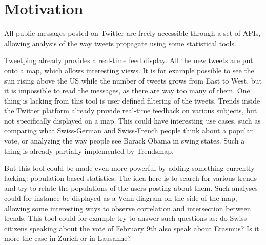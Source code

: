 \section{Motivation}
All public messages posted on Twitter are freely accessible through a set of APIs, allowing analysis of the way tweets propagate using some statistical tools.

\href{http://www.tweetping.net}{Tweetping} already provides a real-time feed display. All the new tweets are put onto a map, which allows interesting views. It is for example possible to see the sun rising above the US while the number of tweets grows from East to West, but it is impossible to read the messages, as there are way too many of them. One thing is lacking from this tool is user defined filtering of the tweets. Trends inside the Twitter platform already provide real-time feedback on various subjects, but not specifically displayed on a map. This could have interesting use cases, such as comparing what Swiss-German and Swiss-French people think about a popular vote, or analyzing the way people see Barack Obama in swing states. Such a thing is already partially implemented by Trendsmap.

But this tool could be made even more powerful by adding something currently lacking: population-based statistics. The idea here is to search for various trends and try to relate the populations of the users posting about them. Such analyses could for instance be displayed as a Venn diagram on the side of the map, allowing some interesting ways to observe correlation and intersection between trends. This tool could for example try to answer such questions as: do Swiss citizens speaking about the vote of February 9th also speak about Erasmus? Is it more the case in Zurich or in Lausanne?
